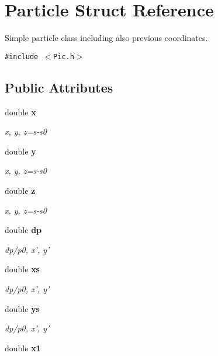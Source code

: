 \section{Particle Struct Reference}
\label{structParticle}
Simple particle class including also previous coordinates. 


{\tt \#include $<$Pic.h$>$}

\subsection*{Public Attributes}
\begin{CompactItemize}
\item 
double {\bf x}\label{structParticle_m0}

\begin{CompactList}\small\item\em x, y, z=s-s0\item\end{CompactList}\item 
double {\bf y}\label{structParticle_m1}

\begin{CompactList}\small\item\em x, y, z=s-s0\item\end{CompactList}\item 
double {\bf z}\label{structParticle_m2}

\begin{CompactList}\small\item\em x, y, z=s-s0\item\end{CompactList}\item 
double {\bf dp}\label{structParticle_m3}

\begin{CompactList}\small\item\em dp/p0, x', y'\item\end{CompactList}\item 
double {\bf xs}\label{structParticle_m4}

\begin{CompactList}\small\item\em dp/p0, x', y'\item\end{CompactList}\item 
double {\bf ys}\label{structParticle_m5}

\begin{CompactList}\small\item\em dp/p0, x', y'\item\end{CompactList}\item 
double {\bf x1}\label{structParticle_m6}


\end{CompactItemize}
